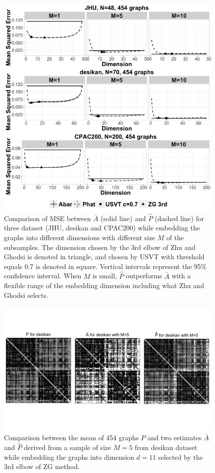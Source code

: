 \documentclass[a4paper]{article}
\begin{document}
\begin{figure}[!htb]
\centering
\includegraphics[width=1\textwidth]{realdata.png}
\caption{Comparison of MSE between $\bar{A}$ (solid line) and $\hat{P}$ (dashed line) for three dataset (JHU, desikan and CPAC200) while embedding the graphs into different dimensions with different size $M$ of the subsamples. The dimension chosen by the 3rd elbow of Zhu and Ghodsi is denoted in triangle, and chosen by USVT with threshold equals 0.7 is denoted in square.  Vertical intervals represent the 95\% confidence interval.  When $M$ is small, $\hat{P}$ outperforms $\bar{A}$ with a flexible range of the embedding dimension including what Zhu and Ghodsi selects.}
\label{fig:realdata}
\end{figure}




\begin{figure}[!htb]
\centering
\includegraphics[width=1\textwidth]{Matrix_desikan_m5.png}
\caption{Comparison between the mean of 454 graphs $P$ and two estimates $\bar{A}$ and $\hat{P}$ derived from a sample of size $M=5$ from desikan dataset while embedding the graphs into dimension $d=11$ selected by the 3rd elbow of ZG method.}
\label{fig:Matrix_desikan_m5}
\end{figure}
\end{document}

